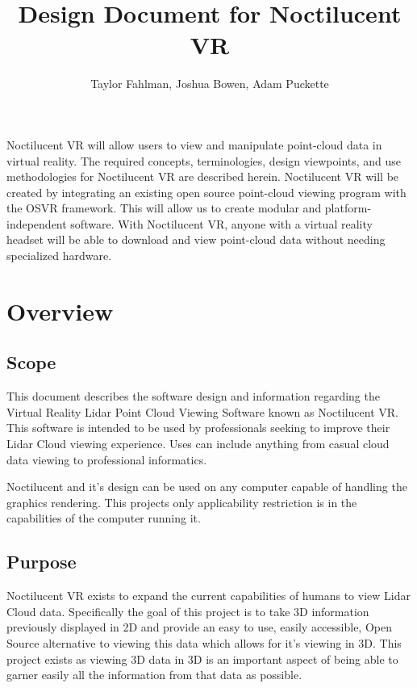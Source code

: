 \title {Design Document for Noctilucent VR}
\author {Taylor Fahlman, Joshua Bowen, Adam Puckette}

\maketitle

\abstract

Noctilucent VR will allow users to view and manipulate point-cloud data in virtual reality. 
The required concepts, terminologies, design viewpoints, and use methodologies for Noctilucent VR are described herein. 
Noctilucent VR will be created by integrating an existing open source point-cloud viewing program with the OSVR framework. 
This will allow us to create modular and platform-independent software. 
With Noctilucent VR, anyone with a virtual reality headset will be able to download and view point-cloud data without needing specialized hardware.

\newpage
\thispagestyle{empty}

\tableofcontents

\newpage
\thispagestyle{empty}
\mbox{}

\section{Overview}
\subsection{Scope}

This document describes the software design and information regarding the Virtual Reality Lidar Point Cloud Viewing Software known as Noctilucent VR.
This software is intended to be used by professionals seeking to improve their Lidar Cloud viewing experience.
Uses can include anything from casual cloud data viewing to professional informatics.

Noctilucent and it's design can be used on any computer capable of handling the graphics rendering.
This projects only applicability restriction is in the capabilities of the computer running it.

\subsection{Purpose}

Noctilucent VR exists to expand the current capabilities of humans to view Lidar Cloud data.
Specifically the goal of this project is to take 3D information previously displayed in 2D and provide an easy to use, easily accessible, Open Source alternative to viewing this data which allows for it's viewing in 3D.
This project exists as viewing 3D data in 3D is an important aspect of being able to garner easily all the information from that data as possible.


